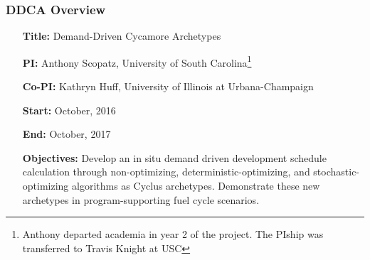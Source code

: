 \begin{frame}
        \frametitle{DDCA Overview}
        \begin{itemize}
                  \setlength{\itemindent}{1cm}
                \item[\textbf{Title:}] Demand-Driven Cycamore Archetypes 
                \item[\textbf{PI:}] Anthony Scopatz, University of South 
                        Carolina\footnote{Anthony departed academia in year 2 
                        of the project. The PIship was transferred to Travis 
                        Knight at USC}
                \item[\textbf{Co-PI:}] Kathryn Huff, University of Illinois at 
                        Urbana-Champaign
                \item[\textbf{Start:}] October, 2016
                \item[\textbf{End:}] October, 2017
                \item[\textbf{Objectives:}] Develop an in situ demand 
                        driven development schedule calculation through 
                        non-optimizing, deterministic-optimizing, and 
                        stochastic-optimizing algorithms as Cyclus archetypes. 
                        Demonstrate these new archetypes in program-supporting 
                        fuel cycle scenarios.
        \end{itemize}
\end{frame}


